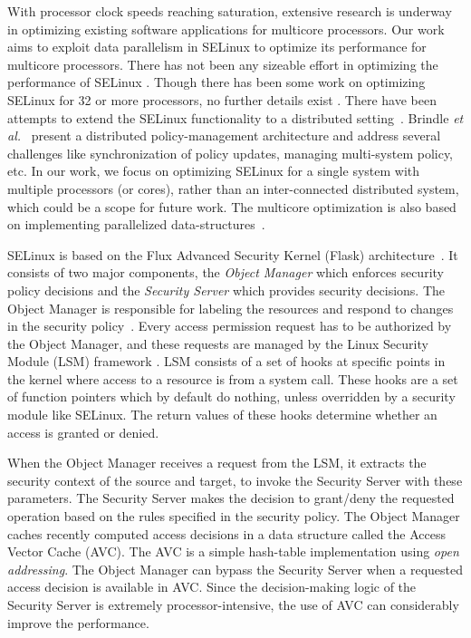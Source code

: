 \documentclass[conference]{IEEEtran}
\begin{document}
With processor clock speeds reaching saturation, extensive research is
underway in optimizing existing software applications for multicore
processors.  Our work aims to exploit data parallelism in SELinux to
optimize its performance for multicore processors.  There has not been
any sizeable effort in optimizing the performance of SELinux
\cite{selinuxFAQ}.  Though there has been some work on optimizing
SELinux for 32 or more processors, no further details exist
\cite{selinuxFAQ}.  There have been attempts to extend the SELinux
functionality to a distributed setting~\cite{tresys}.  Brindle
\emph{et al.}~\cite{tresys} present a distributed policy-management
architecture and address several challenges like synchronization of
policy updates, managing multi-system policy, etc.  In our work, we
focus on optimizing SELinux for a single system with multiple
processors (or cores), rather than an inter-connected distributed
system, which could be a scope for future work.  The multicore
optimization is also based on implementing parallelized
data-structures~\cite{ll1}.

SELinux is based on the Flux Advanced Security Kernel (Flask)
architecture~\cite{flask}.  It consists of two major components, the
\emph{Object Manager} which enforces security policy decisions and the
\emph{Security Server} which provides security decisions.  The Object
Manager is responsible for labeling the resources and respond to
changes in the security policy~\cite{flask}. Every access permission
request has to be authorized by the Object Manager, and these requests
are managed by the Linux Security Module (LSM) framework
\cite{selinuxBook}.  LSM consists of a set of hooks at specific points
in the kernel where access to a resource is from a system call.  These
hooks are a set of function pointers which by default do nothing,
unless overridden by a security module like SELinux.  The return
values of these hooks determine whether an access is granted or
denied.

When the Object Manager receives a request from the LSM, it extracts
the security context of the source and target, to invoke the Security
Server with these parameters.  The Security Server makes the decision
to grant/deny the requested operation based on the rules specified in
the security policy.  The Object Manager caches recently computed 
access decisions in a data structure called the Access Vector Cache
(AVC).  The AVC is a simple hash-table implementation
using \emph{open addressing}. The Object Manager can bypass the Security Server when a requested
access decision is available in AVC. Since the
decision-making logic of the Security Server is extremely
processor-intensive, the use of AVC can considerably improve the performance. 
\end{document}

